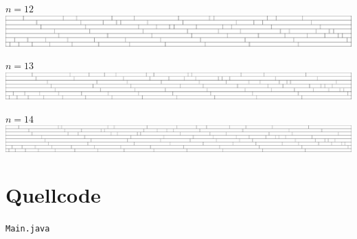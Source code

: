 \documentclass[a4paper, notitlepage, 12pt]{scrartcl}
\newenvironment{longlisting}{\captionsetup{type=listing}}{}
\begin{document}
\begin{center}
\par\vspace{1em}
$n = 12$\\
\includegraphics[width=\textwidth]{../Bwinf-Aufgabe1-KunstDerFuge/visualisierung/mauer-12.pdf}
\par\vspace{1em}
$n = 13$\\
\includegraphics[width=\textwidth]{../Bwinf-Aufgabe1-KunstDerFuge/visualisierung/mauer-13.pdf}
\par\vspace{1em}
$n = 14$\\
\includegraphics[width=\textwidth]{../Bwinf-Aufgabe1-KunstDerFuge/visualisierung/mauer-14.pdf}
\end{center}

 \section{Quellcode}
 \renewcommand{\listingscaption}{Quellcode}
 
 \begin{longlisting}
 \caption{\texttt{Main.java}}
 \end{longlisting}
 
 
\end{document}
